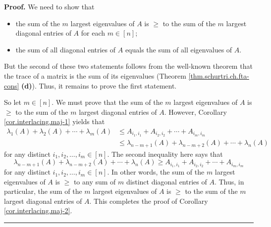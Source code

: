 \documentclass[numbers=enddot,12pt,final,onecolumn,notitlepage]{scrartcl}%
\numberwithin{exer}{subsection}
\theoremstyle{definition}
\newenvironment{proof}[1][Proof]{\noindent\textbf{#1.} }{\ \rule{0.5em}{0.5em}}
\begin{document}
\begin{proof}
We need to show that

\begin{itemize}
\item the sum of the $m$ largest eigenvalues of $A$ is $\geq$ to the sum of
the $m$ largest diagonal entries of $A$ for each $m\in\left[  n\right]  $;

\item the sum of all diagonal entries of $A$ equals the sum of all eigenvalues
of $A$.
\end{itemize}

But the second of these two statements follows from the well-known theorem
that the trace of a matrix is the sum of its eigenvalues (Theorem
\ref{thm.schurtri.ch.fta-cons} \textbf{(d)}). Thus, it remains to prove the
first statement.

So let $m\in\left[  n\right]  $. We must prove that the sum of the $m$ largest
eigenvalues of $A$ is $\geq$ to the sum of the $m$ largest diagonal entries of
$A$. However, Corollary \ref{cor.interlacing.maj-1} yields that%
\begin{align*}
\lambda_{1}\left(  A\right)  +\lambda_{2}\left(  A\right)  +\cdots+\lambda
_{m}\left(  A\right)   &  \leq A_{i_{1},i_{1}}+A_{i_{2},i_{2}}+\cdots
+A_{i_{m},i_{m}}\\
&  \leq\lambda_{n-m+1}\left(  A\right)  +\lambda_{n-m+2}\left(  A\right)
+\cdots+\lambda_{n}\left(  A\right)
\end{align*}
for any distinct $i_{1},i_{2},\ldots,i_{m}\in\left[  n\right]  $. The second
inequality here says that%
\[
\lambda_{n-m+1}\left(  A\right)  +\lambda_{n-m+2}\left(  A\right)
+\cdots+\lambda_{n}\left(  A\right)  \geq A_{i_{1},i_{1}}+A_{i_{2},i_{2}%
}+\cdots+A_{i_{m},i_{m}}%
\]
for any distinct $i_{1},i_{2},\ldots,i_{m}\in\left[  n\right]  $. In other
words, the sum of the $m$ largest eigenvalues of $A$ is $\geq$ to any sum of
$m$ distinct diagonal entries of $A$. Thus, in particular, the sum of the $m$
largest eigenvalues of $A$ is $\geq$ to the sum of the $m$ largest diagonal
entries of $A$. This completes the proof of Corollary
\ref{cor.interlacing.maj-2}.
\end{proof}
\end{document}
